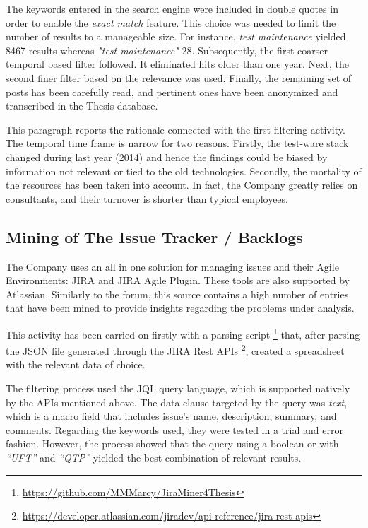 The keywords entered in the search engine were included in double quotes in order to enable the \textit{exact match} feature. This choice was needed to limit the number of results to a manageable size. For instance, \textit{test maintenance} yielded 8467 results whereas \textit{"test maintenance"} 28. Subsequently, the first coarser temporal based filter followed. It eliminated hits older than one year. Next, the second finer filter based on the relevance was used. Finally, the remaining set of posts has been carefully read, and pertinent ones have been anonymized and transcribed in the Thesis database.

This paragraph reports the rationale connected with the first filtering activity. The temporal time frame is narrow for two reasons. Firstly, the test-ware stack changed during last year (2014) and hence the findings could be biased by information not relevant or tied to the old technologies. Secondly, the mortality of the resources has been taken into account. In fact, the Company greatly relies on consultants, and their turnover is shorter than typical employees. 

\subsection{Mining of The Issue Tracker / Backlogs} \label{mining_issue_tracker}
The Company uses an all in one solution for managing issues and their Agile Environments: JIRA and JIRA Agile Plugin. These tools are also supported by Atlassian. Similarly to the forum, this source contains a high number of entries that have been mined to provide insights regarding the problems under analysis.

This activity has been carried on firstly with a parsing script \footnote{\href{https://github.com/MMMarcy/JiraMiner4Thesis}{https://github.com/MMMarcy/JiraMiner4Thesis}} that, after parsing the JSON file generated through the JIRA Rest APIs \footnote{\href{https://developer.atlassian.com/jiradev/api-reference/jira-rest-apis}{https://developer.atlassian.com/jiradev/api-reference/jira-rest-apis}}, created a spreadsheet with the relevant data of choice.


The filtering process used the JQL query language, which is supported natively by the APIs mentioned above. The data clause targeted by the query was \textit{text}, which is a macro field that includes issue's name, description, summary, and comments. Regarding the keywords used, they were tested in a trial  and error fashion. However, the process showed that the query using a boolean or with \textit{``UFT''} and \textit{``QTP''} yielded the best combination of relevant results.

